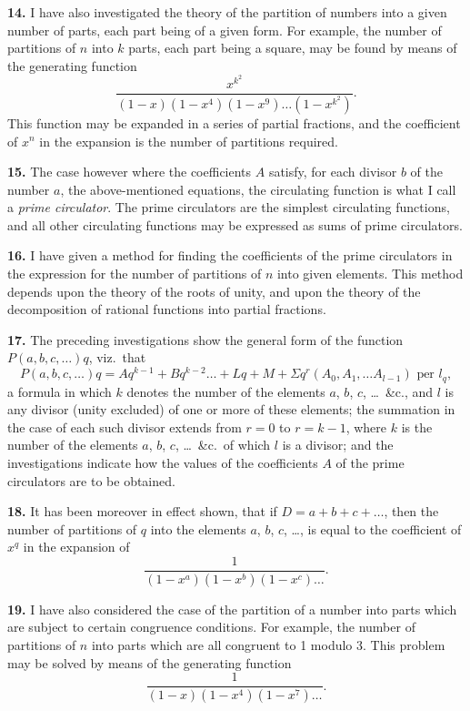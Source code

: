 \documentclass[11pt,a4paper]{book}
\begin{document}
\textbf{14.} I have also investigated the theory of the partition of numbers into a given number of parts, each part being of a given form. For example, the number of partitions of $n$ into $k$ parts, each part being a square, may be found by means of the generating function
\[
\frac{x^{k^2}}{(1-x)(1-x^4)(1-x^9)\ldots(1-x^{k^2})}.
\]
This function may be expanded in a series of partial fractions, and the coefficient of $x^n$ in the expansion is the number of partitions required.

\newpage
\setcounter{page}{240}

\textbf{15.} The case however where the coefficients $A$ satisfy, for each divisor $b$ of the number $a$, the above-mentioned equations, the circulating function is what I call a \textit{prime circulator}. The prime circulators are the simplest circulating functions, and all other circulating functions may be expressed as sums of prime circulators.

\textbf{16.} I have given a method for finding the coefficients of the prime circulators in the expression for the number of partitions of $n$ into given elements. This method depends upon the theory of the roots of unity, and upon the theory of the decomposition of rational functions into partial fractions.

\textbf{17.} The preceding investigations show the general form of the function $P(a, b, c, \ldots)q$, viz.\ that
\[
P(a, b, c, \ldots)q = Aq^{k-1} + Bq^{k-2} \ldots + Lq + M + \Sigma q^r (A_0, A_1, \ldots A_{l-1}) \text{ per } l_q,
\]
a formula in which $k$ denotes the number of the elements $a$, $b$, $c$, \ldots\ \&c., and $l$ is any divisor (unity excluded) of one or more of these elements; the summation in the case of each such divisor extends from $r = 0$ to $r = k-1$, where $k$ is the number of the elements $a$, $b$, $c$, \ldots\ \&c.\ of which $l$ is a divisor; and the investigations indicate how the values of the coefficients $A$ of the prime circulators are to be obtained.

\newpage
\setcounter{page}{241}

\textbf{18.} It has been moreover in effect shown, that if $D = a + b + c + \ldots$, then the number of partitions of $q$ into the elements $a$, $b$, $c$, \ldots, is equal to the coefficient of $x^q$ in the expansion of
\[
\frac{1}{(1-x^a)(1-x^b)(1-x^c)\ldots}.
\]

\textbf{19.} I have also considered the case of the partition of a number into parts which are subject to certain congruence conditions. For example, the number of partitions of $n$ into parts which are all congruent to 1 modulo 3. This problem may be solved by means of the generating function
\[
\frac{1}{(1-x)(1-x^4)(1-x^7)\ldots}.
\]
\end{document}
